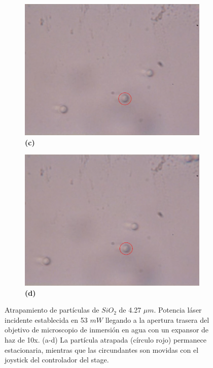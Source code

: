 \documentclass[10pt,aspectratio=1610,compress,dvipsnames]{beamer}
\begin{document}
\begin{frame}
{\begin{figure}
  \begin{subfigure}[b]{0.2\linewidth}
    \includegraphics[width=\linewidth]{427particles/i.png} %
    \caption*{\textbf{(c)}}
    \label{fig7:c}
  \end{subfigure}\hspace{0.5cm} %
  \begin{subfigure}[b]{0.2\linewidth}
    \includegraphics[width=\linewidth]{427particles/4.png} %
    \caption*{\textbf{(d)}}
    \label{fig7:d}
  \end{subfigure}
  \caption{
Atrapamiento de partículas de $SiO_2$ de 4.27 $\mu m$. Potencia láser incidente establecida en 53 $mW$ llegando a la apertura trasera del objetivo de microscopio de inmersión en agua con un expansor de haz de 10x. (a-d) La partícula atrapada (círculo rojo) permanece estacionaria, mientras que las circundantes son movidas con el joystick del controlador del stage.}
  \label{poresfrustrules}
\end{figure}}



\end{frame}
\end{document}
